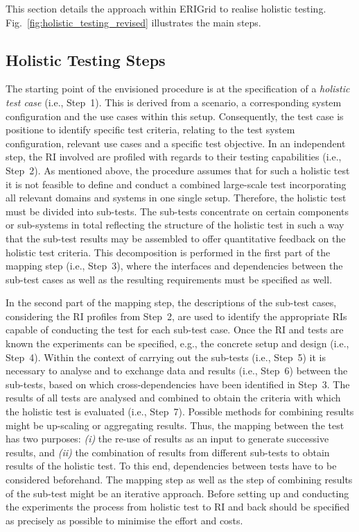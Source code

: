 This section details the approach within ERIGrid to realise holistic testing. 
Fig.~\ref{fig:holistic_testing_revised} illustrates the main steps.

\subsection{Holistic Testing Steps}
The starting point of the envisioned procedure is at the specification of a \emph{holistic test case} (i.e., Step~1). This is derived from a scenario, a corresponding system configuration and the use cases within this setup. Consequently,
the test case is positione to identify specific test criteria, relating to the test system configuration, relevant use cases and a specific test objective. 
In an independent step, the RI involved are profiled with regards to their testing capabilities (i.e., Step~2).
As mentioned above, the procedure assumes that for such a holistic test it is not feasible to define and conduct a combined large-scale test incorporating all relevant domains and systems in one single setup. Therefore, the holistic test must be divided into sub-tests.
The sub-tests concentrate on certain components or sub-systems in total reflecting the structure of the holistic test in such a way that the sub-test results may be assembled to offer quantitative feedback on the holistic test criteria. This decomposition is performed in the first part of the mapping step (i.e., Step~3), where the interfaces and dependencies between the sub-test cases as well as the resulting requirements must be specified as well. 

In the second part of the mapping step, the descriptions of the sub-test cases, considering the RI profiles from Step~2, are used to identify the appropriate RIs capable of conducting the test for each sub-test case. 
Once the RI and tests are known the experiments can be specified, e.g., the concrete setup and design (i.e., Step~4).
Within the context of carrying out the sub-tests (i.e., Step~5) it is necessary to analyse and to exchange data and results (i.e., Step~6) between the sub-tests, based on which cross-dependencies have been identified in Step~3.
The results of all tests are analysed and combined to obtain the criteria with which the holistic test is evaluated (i.e., Step~7). Possible methods for combining results might be up-scaling or aggregating results.
Thus, the mapping between the test has two purposes: \emph{(i)} the re-use of results as an input to generate successive results, and \emph{(ii)} the combination of results from different sub-tests to obtain results of the holistic test.
To this end, dependencies between tests have to be considered beforehand.
The mapping step as well as the step of combining results of the sub-test might be an iterative approach. Before setting up and conducting the experiments the process from holistic test to RI and back should be specified as precisely as possible to minimise the effort and costs.

